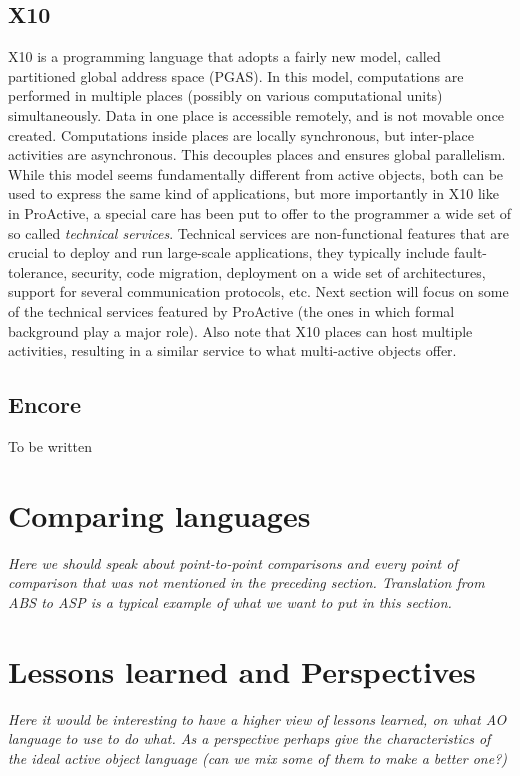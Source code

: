 \subsection{X10} 
X10 \cite{charles2005x10} is a programming language that adopts a
fairly new model, called partitioned global address space (PGAS). In this model,
computations are performed in multiple places (possibly on various computational units)
simultaneously. Data in one place is accessible remotely, and is not movable once
created. Computations inside places are locally synchronous, but inter-place activities
are asynchronous. This decouples places and ensures global parallelism. While this model
seems fundamentally different from active objects, both can be used to express the same
kind of applications, but more importantly in X10 like in ProActive, a special care has
been put to offer to the programmer a wide set of so called \emph{technical services}.
Technical services are non-functional features that are crucial to deploy and run
large-scale applications, they typically include fault-tolerance, security, code
migration, deployment on a wide set of architectures, support for several communication
protocols, etc. Next section will focus on some of the technical services featured by
ProActive (the ones in which formal background play a major role).  Also note that X10
places can host multiple activities, resulting in a similar service to what multi-active
objects offer.

\subsection{Encore}
To be written

\section{Comparing languages} 

\emph{Here we should speak about point-to-point comparisons and every point of
	comparison that was not mentioned in the preceding section. Translation from ABS to 
	ASP is a typical example of what we want to put in this section.}

\section{Lessons learned and Perspectives}
\emph{Here it would be interesting to have a higher view of lessons learned, on what AO 
language to use to do what. As a perspective perhaps give the characteristics of the 
ideal active object language (can we mix some of them to make a better one?)}